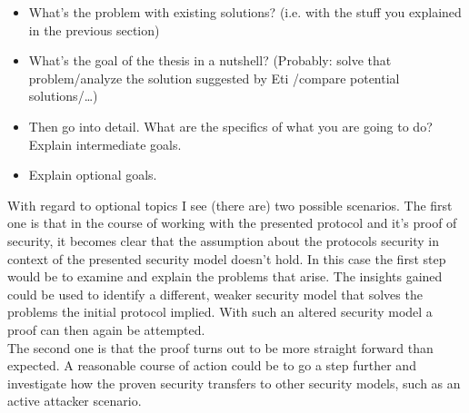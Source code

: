 
\begin{itemize}
  \item What's the problem with existing solutions? (i.e. with the stuff you explained in the previous section)
  \item What's the goal of the thesis in a nutshell? (Probably: solve that problem/analyze the solution suggested by Eti \cite{testref}/compare potential solutions/\dots)
  \item Then go into detail. What are the specifics of what you are going to do? Explain intermediate goals.
  \item Explain optional goals.
\end{itemize}
With regard to optional topics I see (there are) two possible scenarios. 
The first one is that in the course of working with the presented protocol and it's proof of security, it becomes clear that the assumption about the protocols security in context of the presented security model doesn't hold. In this case the first step would be to examine and explain the problems that arise. The insights gained could be used to identify a different, weaker security model that solves the problems the initial protocol implied. With such an altered security model a proof can then again be attempted.\\
The second one is that the proof turns out to be more straight forward than expected. A reasonable course of action could be to go a step further and investigate how the proven security transfers to other security models, such as an active attacker scenario.

